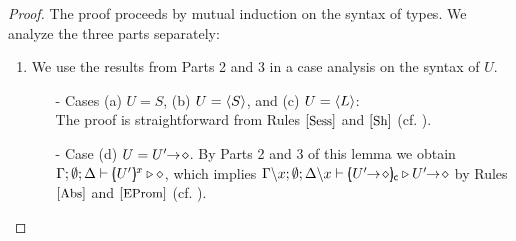 \begin{proof} The proof proceeds by mutual induction on the syntax of types. We analyze the three parts separately: 
	\begin{enumerate}
		\item	We use the results from Parts 2 and 3 in a 
				case analysis on the syntax of $U$.
			\begin{enumerate}
				\item[-]	Cases (a) $U = S$, (b) $U = \langle S \rangle$, and (c) $U = \langle L \rangle$: \\
The proof is straightforward from Rules ${\footnotesize[\textrm{\small Sess}]}$ and ${\footnotesize[\textrm{\small Sh}]}$ (cf. ).

				\item[-]	Case (d) $U = U'\!\! \rightarrow\! \diamond$. By Parts 2 and 3 of this lemma we obtain 
						$\Gamma; \emptyset; \Delta \vdash [\!\!(U')\!\!]^{x} \triangleright \diamond$, which implies 
						$\Gamma \backslash x ; \es; \Delta \backslash x \proves \omapchar{\shot{U'}} \hastype \shot{U'}$
						by
						 Rules ${\footnotesize[\textrm{\small Abs}]}$ and ${\footnotesize[\textrm{\small EProm}]}$ (cf. ).


\end{enumerate}
\end{enumerate}
\end{proof}
